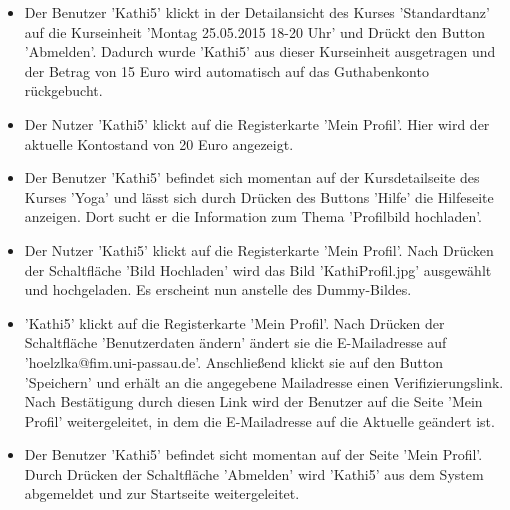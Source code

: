 \documentclass[a4paper]{scrreprt}
\begin{document}
\begin{itemize}
				\item {}
				Der Benutzer 'Kathi5' klickt in der Detailansicht des Kurses 'Standardtanz' auf die Kurseinheit 'Montag 25.05.2015 18-20 Uhr' und Drückt den Button 'Abmelden'. Dadurch wurde 'Kathi5' aus dieser Kurseinheit ausgetragen und der Betrag von 15 Euro wird automatisch auf das Guthabenkonto rückgebucht. 
				
				\item {}
				Der Nutzer 'Kathi5' klickt auf die Registerkarte 'Mein Profil'. Hier wird der aktuelle Kontostand von 20 Euro angezeigt.
				
				\item {}
				Der Benutzer 'Kathi5' befindet sich momentan auf der Kursdetailseite des Kurses 'Yoga' und lässt sich durch Drücken des Buttons 'Hilfe' die Hilfeseite anzeigen. Dort sucht er die Information zum Thema 'Profilbild hochladen'.
					
				\item {}
				Der Nutzer 'Kathi5' klickt auf die Registerkarte 'Mein Profil'. Nach Drücken der Schaltfläche 'Bild Hochladen' wird das Bild 'KathiProfil.jpg' ausgewählt und hochgeladen. Es erscheint nun anstelle des Dummy-Bildes.
				
				\item {}
				'Kathi5' klickt auf die Registerkarte 'Mein Profil'. Nach Drücken der Schaltfläche 'Benutzerdaten ändern' ändert sie die E-Mailadresse auf 'hoelzlka@fim.uni-passau.de'. Anschließend klickt sie auf den Button 'Speichern' und erhält an die angegebene Mailadresse einen Verifizierungslink. Nach Bestätigung durch diesen Link wird der Benutzer auf die Seite 'Mein Profil' weitergeleitet, in dem die E-Mailadresse auf die Aktuelle geändert ist.
				
				\item {}
				Der Benutzer 'Kathi5' befindet sicht momentan auf der Seite 'Mein Profil'. Durch Drücken der Schaltfläche 'Abmelden' wird 'Kathi5' aus dem System abgemeldet und zur Startseite weitergeleitet.	
					
			\end{itemize}
\end{document}
